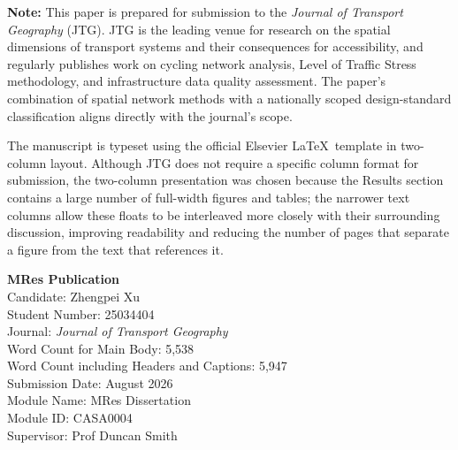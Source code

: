 \documentclass[final,5p,times,twocolumn,authoryear]{elsarticle}
\begin{document}
\onecolumn
\thispagestyle{empty}

\vspace*{2cm} 
\noindent\textbf{Note:} This paper is prepared for submission to the
\textit{Journal of Transport Geography} (JTG). JTG is the leading venue for
research on the spatial dimensions of transport systems and their
consequences for accessibility, and regularly publishes work on cycling
network analysis, Level of Traffic Stress methodology, and infrastructure
data quality assessment. The paper's combination of spatial network methods
with a nationally scoped design-standard classification aligns directly with
the journal's scope.

\vspace{0.4cm}

\noindent The manuscript is typeset using the official Elsevier \LaTeX\ template in two-column layout. Although JTG does
not require a specific column format for submission, the two-column
presentation was chosen because the Results section contains a large number
of full-width figures and tables; the narrower text columns allow these
floats to be interleaved more closely with their surrounding discussion,
improving readability and reducing the number of pages that separate a figure
from the text that references it.

\vspace{\fill}

\begin{center}
{\large\bfseries MRes Publication}\\[1.8cm]

Candidate: Zhengpei Xu\\[0.3cm]
Student Number: 25034404\\[1.2cm]

Journal: \textit{Journal of Transport Geography}\\[1.2cm]

Word Count for Main Body: 5,538\\[0.2cm]
Word Count including Headers and Captions: 5,947\\[1.2cm]

Submission Date: August 2026\\[0.2cm]
Module Name: MRes Dissertation\\[0.2cm]
Module ID: CASA0004\\[0.2cm]
Supervisor: Prof Duncan Smith
\end{center}

\vspace{\fill}
\end{document}
